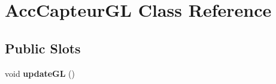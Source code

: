 \hypertarget{class_acc_capteur_g_l}{\section{Acc\-Capteur\-G\-L Class Reference}
\label{class_acc_capteur_g_l}
}
\subsection*{Public Slots}
\begin{DoxyCompactItemize}
\item 
\hypertarget{class_acc_capteur_g_l_a7ff69fa888a47f722c95359113be7acb}{void {\bfseries update\-G\-L} ()}\label{class_acc_capteur_g_l_a7ff69fa888a47f722c95359113be7acb}

\end{DoxyCompactItemize}
